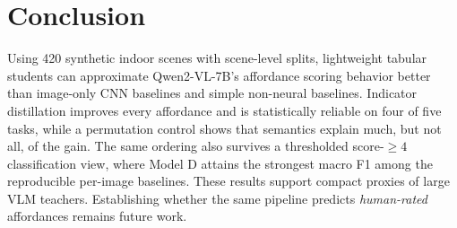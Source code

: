 \documentclass[10pt,twocolumn]{article}
\begin{document}
\section{Conclusion}
\label{sec:conclusion}

Using 420 synthetic indoor scenes with scene-level splits, lightweight tabular
students can approximate Qwen2-VL-7B's affordance scoring behavior better than
image-only CNN baselines and simple non-neural baselines. Indicator
distillation improves every affordance and is statistically reliable on four of
five tasks, while a permutation control shows that semantics explain much, but
not all, of the gain. The same ordering also survives a thresholded
score-$\geq 4$ classification view, where Model D attains the strongest macro
F1 among the reproducible per-image baselines. These results support compact
proxies of large VLM teachers. Establishing whether the same
pipeline predicts
\emph{human-rated} affordances remains future work.



\end{document}
